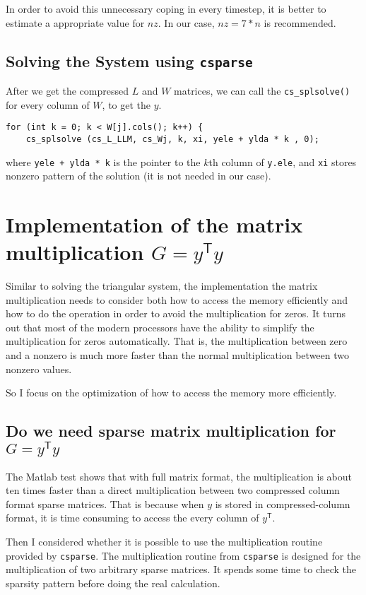 \documentclass[a4paper,fleqn,13pt]{article}
\newcommand\transpose{{}^\mathsf{T}}
\begin{document}
In order to avoid this unnecessary coping in every timestep, it is better to estimate a appropriate value for $nz$. In our case, $nz = 7 * n$ is recommended.

\subsection{Solving the System using \lstinline!csparse!}
After we get the compressed $L$ and $W$ matrices, we can call the \lstinline!cs_splsolve()! for every column of $W$, to get the $y$.
  \begin{lstlisting}[float=!h, caption=solving the $k$th column of $W$, label=Code:solving, mathescape=true]
  for (int k = 0; k < W[j].cols(); k++) {
    cs_splsolve (cs_L_LLM, cs_Wj, k, xi, yele + ylda * k , 0);
  \end{lstlisting}
where \lstinline!yele + ylda * k! is the pointer to the $k$th column of \lstinline!y.ele!, and \lstinline!xi! stores nonzero pattern of the solution (it is not needed in our case).

\section{Implementation of the matrix multiplication $G = {y}\transpose y $}
Similar to solving the triangular system, the implementation the matrix multiplication needs to consider both how to access the memory efficiently and how to do the operation in order to avoid the multiplication for zeros.
It turns out that most of the modern processors have the ability to simplify the multiplication for zeros automatically. That is, the multiplication between zero and a nonzero is much more faster than the normal multiplication between two nonzero values.

So I focus on the optimization of how to access the memory more efficiently.
  
\subsection{Do we need sparse matrix multiplication for $G = {y}\transpose y $}
The Matlab test shows that with full matrix format, the multiplication is about ten times faster than a direct multiplication between two compressed column format sparse matrices.
That is because when $y$ is stored in compressed-column format, it is time consuming to access the every column of ${y}\transpose$.

Then I considered whether it is possible to use the multiplication routine provided by \lstinline!csparse!. The multiplication routine from \lstinline!csparse! is designed for the multiplication of two arbitrary sparse matrices. It spends some time to check the sparsity pattern before doing the real calculation.
\end{document}
